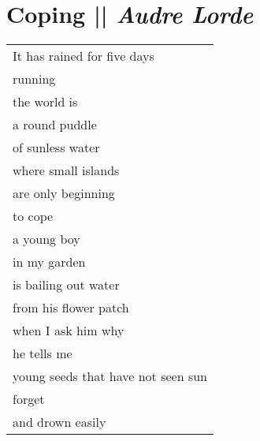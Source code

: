 \section[Coping]{Coping || \emph{Audre Lorde} \hspace*{\fill}  \thepage}
\vfill
\begin{center}
\begin{tabular}{l}
It has rained for five days\\
running\\
the world is\\
a round puddle\\
of sunless water\\
where small islands\\
are only beginning\\
to cope\\
a young boy\\
in my garden\\
is bailing out water\\
from his flower patch\\
when I ask him why\\
he tells me\\
young seeds that have not seen sun\\
forget\\
and drown easily
\end{tabular}
\end{center}
\vfill